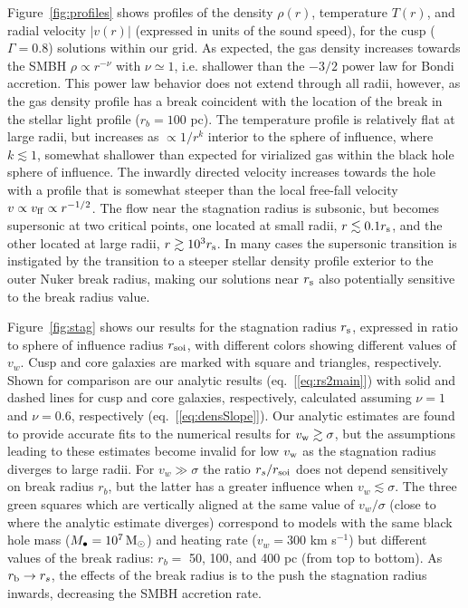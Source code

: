 \documentclass[usenatbib,fleqn]{mn2e}
\newcommand{\rs}{r_s}
\newcommand{\rb}{r_b}
\newcommand{\Mbh}[1][]{M_{\bullet#1}}
\newcommand{\soi}{\rm soi}
\newcommand{\rsoi}{r_{\soi}}
\newcommand{\densSlope}{\nu}
\begin{document}
Figure~\ref{fig:profiles} shows profiles of the density $\rho(r)$,
temperature $T(r)$, and radial velocity $|v(r)|$ (expressed in units of the sound speed), for the cusp
($\Gamma=0.8$) solutions within our grid.  As expected, the gas
density increases towards the SMBH $\rho\propto r^{-\densSlope}$ with
$\densSlope\simeq1$, i.e. shallower than the $-3/2$ power law for
Bondi accretion. This power law behavior does not extend
through all radii, however, as the gas density profile has a break coincident
with the location of the break in the stellar light profile ($\rb=100$
pc). The temperature profile is relatively flat at large radii, but
increases as $\propto 1/r^{k}$ interior to the sphere of influence,
where $k\lesssim 1$, somewhat shallower than expected for virialized gas within the black hole sphere of influence.
The inwardly directed velocity increases towards the hole with a profile that is somewhat steeper than the local free-fall velocity $v \propto v_{\rm ff}\propto r^{-1/2}$.  The flow near the stagnation radius is subsonic, but becomes supersonic at two critical points, one located at small radii, $r \lesssim 0.1r_{\rm s}$, and the other located at large radii, $r \gtrsim 10^{3}r_{\rm s}$.  In many cases the supersonic transition is instigated by the transition to a steeper stellar density profile exterior to the outer Nuker break radius, making our solutions near $r_{\rm s}$ also potentially sensitive to the break radius value.

Figure~\ref{fig:stag} shows our results for the stagnation radius
$r_{\rm s}$, expressed in ratio to sphere of influence radius $r_{\rm
  soi}$, with different colors showing different values of $v_{w}$.
Cusp and core galaxies are marked with square and triangles,
respectively.  Shown for comparison are our analytic results
(eq.~[\ref{eq:rs2main}]) with solid and dashed lines for cusp and core
galaxies, respectively, calculated assuming $\densSlope = 1$ and
$\densSlope= 0.6$, respectively (eq.~[\ref{eq:densSlope}]).  Our analytic estimates are found to
provide accurate fits to the numerical results for $v_{\rm w} \gtrsim
\sigma$, but the assumptions leading to these estimates become invalid
for low $v_{\rm w}$ as the stagnation radius diverges to large radii.
For $v_{w} \gg \sigma$ the ratio $\rs/\rsoi$ does not depend
sensitively on break radius $r_{b}$, but the latter has a greater
influence when $v_{w} \lesssim \sigma$.  The three green squares which
are vertically aligned at the same value of $v_{w}/\sigma$ (close to
where the analytic estimate diverges) correspond to models with the
same black hole mass ($\Mbh = 10^7 \Msun$) and heating rate ($v_w =
300$ km s$^{-1}$) but different values of the break radius: $r_{b} = $
50, 100, and 400 pc (from top to bottom).  As $r_{\rm b} \rightarrow
r_{s}$, the effects of the break radius is to the push the stagnation
radius inwards, decreasing the SMBH accretion rate.
\end{document}
